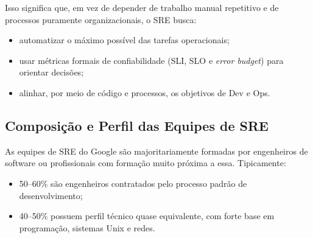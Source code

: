 \documentclass[12pt,a4paper]{report}
\begin{document}
Isso significa que, em vez de depender de trabalho manual repetitivo e de
processos puramente organizacionais, o SRE busca:
\begin{itemize}[nosep]
    \item automatizar o máximo possível das tarefas operacionais;
    \item usar métricas formais de confiabilidade (SLI, SLO e \emph{error
    budget}) para orientar decisões;
    \item alinhar, por meio de código e processos, os objetivos de Dev e Ops.

        
        
\end{itemize}

\subsection{Composição e Perfil das Equipes de SRE}

As equipes de SRE do Google são majoritariamente formadas por engenheiros de
software ou profissionais com formação muito próxima a essa. Tipicamente:
\begin{itemize}[nosep]
    \item 50--60\% são engenheiros contratados pelo processo padrão de
    desenvolvimento;
    \item 40--50\% possuem perfil técnico quase equivalente, com forte base
    em programação, sistemas Unix e redes.
\end{itemize}
\end{document}
